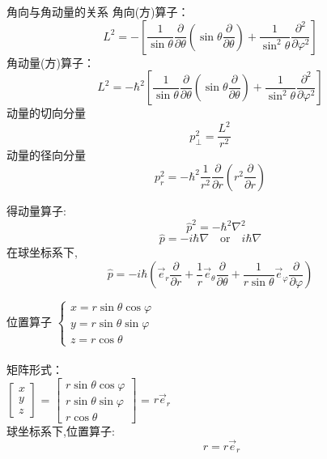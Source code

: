 	{角向与角动量的关系}	
	角向(方)算子：
	\begin{equation*}
		L^2 = - \left[ \frac{1}{ \sin \theta  } \frac{\partial }{\partial \theta } (\sin \theta \frac{\partial }{\partial \theta } )
		+\frac{1}{ \sin^2 \theta  } \frac{\partial^2}{\partial\varphi ^2} \right]
	\end{equation*}	
    角动量(方)算子：
		\begin{equation*}
		L^2 = -\hbar ^2 \left[ \frac{1}{ \sin \theta  } \frac{\partial }{\partial \theta } (\sin \theta \frac{\partial }{\partial \theta } )
		+\frac{1}{ \sin^2 \theta  } \frac{\partial^2}{\partial\varphi ^2} \right]
	\end{equation*}	
	动量的切向分量
	\begin{equation*}
	p_ \perp  ^2 =  \frac{L^2}{r^2}
	\end{equation*}	
	动量的径向分量
	\[ p_r ^2 = -\hbar ^2  \frac{1}{r^2} \frac{\partial }{\partial r} (r^2\frac{\partial }{\partial r} ) \]
		


	得动量算子: 
	\[ \hspace{1em}\hat{p}^2 =-\hbar ^2 \nabla ^{2}
		\]
	\[ \hat{p} =-i\hbar \nabla \quad \text{or} \quad i\hbar \nabla\]
	在球坐标系下,
	\[ \hat{p} =-i\hbar  ( \vec{e}_{r} \frac{\partial}{\partial r}+\frac{1}{r} \vec{e}_{\theta} \frac{\partial}{\partial \theta}+\frac{1}{r \sin \theta} \vec{e}_{\varphi} \frac{\partial}{\partial \varphi})
		\]
		


	{位置算子 }	
	$\begin{cases}
		x= r\sin \theta \cos \varphi \\
		y= r\sin \theta \sin \varphi \\
		z=r\cos \theta
	\end{cases} $\\ 
	~~\\
	矩阵形式： \\ \vspace{0.6em}
	$
	\left[\begin{array}{ccc}
		x \\
		y \\
		z
	\end{array}\right]$
	=
	$\left[\begin{array}{ccc}
		r\sin \theta \cos \varphi  \\
		r\sin \theta \sin \varphi  \\
		r\cos \theta
	\end{array}\right]$	
	=
	$r \vec{e}_r$ \\ \vspace{0.3cm}
	球坐标系下,位置算子:
	\[ \qquad \hat{r}=r \vec{e}_r \]
	


